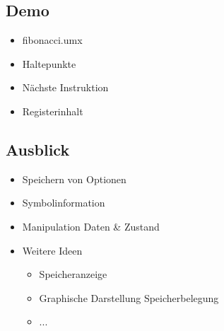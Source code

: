 \subsection{Demo}

\begin{frame}{\insertsubsection}
    \begin{itemize}
    \item fibonacci.umx
    \item Haltepunkte
    \item Nächste Instruktion
    \item Registerinhalt
    \end{itemize}
\end{frame}

\subsection{Ausblick}

\begin{frame}{\insertsubsection}
    \begin{itemize}
    \item Speichern von Optionen
    \item Symbolinformation
    \item Manipulation Daten \& Zustand
    \item Weitere Ideen
    \begin{itemize}
    	\item Speicheranzeige
    	\item Graphische Darstellung Speicherbelegung
    	\item ...
    \end{itemize}
    \end{itemize}
\end{frame}